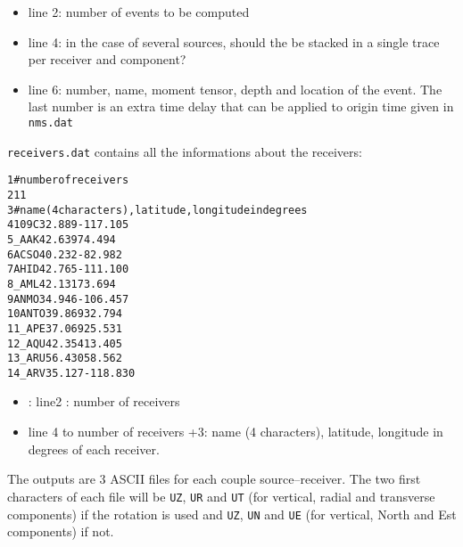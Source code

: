 \documentclass[11pt]{article}
\begin{document}
\begin{itemize}	
\item line 2: number of events to be computed
\item line 4: in the case of several sources, should the be stacked
in a single trace per receiver and component?
\item line 6: number, name, moment tensor, depth and location of the
event. The last number is an extra time delay that can be applied to
origin time given in {\tt nms.dat} 
\end{itemize}	
{\tt \large receivers.dat} contains all the informations about the receivers:
\begin{alltt}
\small
 1 #number of receivers
 2 11
 3 #name (4 characters), latitude, longitude in degrees
 4 109C   32.889 -117.105
 5 _AAK   42.639   74.494
 6 ACSO   40.232  -82.982
 7 AHID   42.765 -111.100
 8 _AML   42.131   73.694
 9 ANMO   34.946 -106.457
10 ANTO   39.869   32.794
11 _APE   37.069   25.531
12 _AQU   42.354   13.405
13 _ARU   56.430   58.562
14 _ARV   35.127 -118.830
\end{alltt}	
\begin{itemize}	
\item: line2 : number of receivers
\item line 4 to  number of receivers +3: name (4 characters),
latitude, longitude in degrees of each receiver.
\end{itemize}	
The outputs are 3 ASCII files for each couple source--receiver. The two
first characters of each file will be {\tt UZ}, {\tt UR} and {\tt UT}
(for vertical, radial and transverse components) if the rotation is
used and {\tt UZ}, {\tt UN} and {\tt UE} (for vertical, North and Est
components) if not. 
\end{document}
